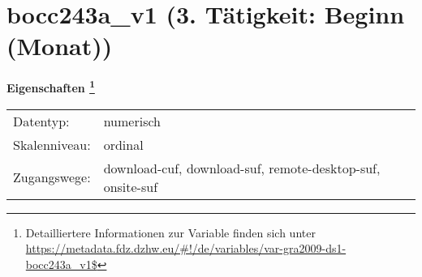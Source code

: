 
    \setcounter{footnote}{0}

    \vspace*{-1.8cm}
	\section{bocc243a\_v1 (3. Tätigkeit: Beginn (Monat))}
	\label{section:bocc243a_v1}



    \vspace*{0.5cm}
    \noindent\textbf{Eigenschaften
	\footnote{Detailliertere Informationen zur Variable finden sich unter
		\url{https://metadata.fdz.dzhw.eu/\#!/de/variables/var-gra2009-ds1-bocc243a_v1$}}}\\
	\begin{tabularx}{\hsize}{@{}lX}
	Datentyp: & numerisch \\
	Skalenniveau: & ordinal \\
	Zugangswege: &
	  download-cuf, 
	  download-suf, 
	  remote-desktop-suf, 
	  onsite-suf
 \\
    \end{tabularx}



